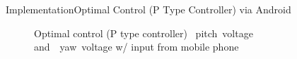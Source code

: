 \documentclass{beamer}
\begin{document}
%
\begin{frame}{Implementation}{Optimal Control (P Type Controller) via Android}
    \begin{figure}
      \centering
      \caption{Optimal control (P type controller) ~pitch~voltage and~~yaw~voltage w/ input from mobile phone}
      \label{fig:LQR_Volt}
    \end{figure}
\end{frame}
\end{document}
